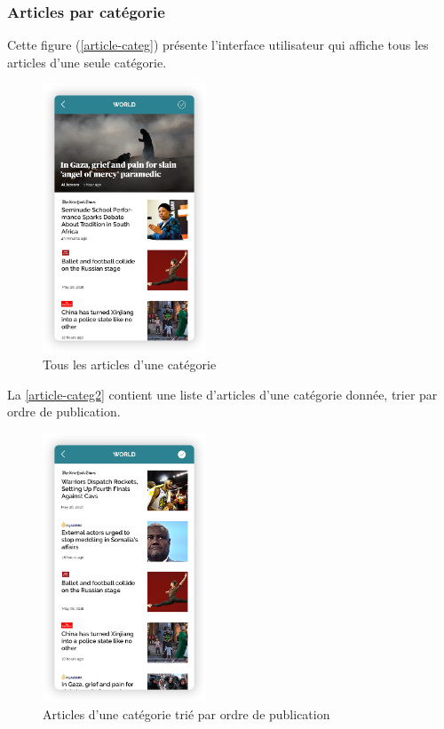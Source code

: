 \subsubsection{Articles par catégorie}
Cette figure (\autoref{article-categ}) présente l'interface utilisateur qui affiche tous les articles d'une seule catégorie. 
\begin{figure}[H]
    \centering
    \includegraphics[width=138pt]{img/chapter4/feedny/en-categ-articles1.png}
    \caption{Tous les articles d'une catégorie}
    \label{article-categ}
\end{figure}

La \autoref{article-categ2} contient une liste d'articles d'une catégorie donnée, trier par ordre de publication.
\begin{figure}[H]
    \centering
    \includegraphics[width=138pt]{img/chapter4/feedny/en-categ-articles.png}
    \caption{Articles d'une catégorie trié par ordre de publication}
    \label{article-categ2}
\end{figure}

